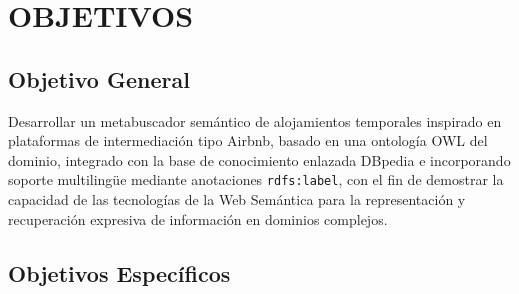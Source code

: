 \section{OBJETIVOS}

\subsection{Objetivo General}

Desarrollar un metabuscador semántico de alojamientos temporales inspirado en
plataformas de intermediación tipo Airbnb, basado en una ontología OWL del
dominio, integrado con la base de conocimiento enlazada DBpedia e incorporando
soporte multilingüe mediante anotaciones \texttt{rdfs:label}, con el fin de
demostrar la capacidad de las tecnologías de la Web Semántica para la
representación y recuperación expresiva de información en dominios complejos.

\subsection{Objetivos Específicos}

